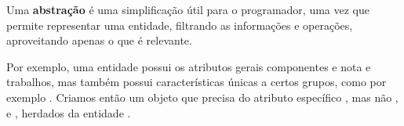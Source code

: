 Uma \textbf{abstração} é uma simplificação útil para o programador, uma vez que
permite representar uma entidade, filtrando as informações e operações,
aproveitando apenas o que é relevante.

Por exemplo, uma entidade  possui os atributos gerais
componentes e nota e trabalhos, mas também possui características únicas a
certos grupos, como por exemplo . Criamos então um objeto
 que precisa do atributo específico , mas não
,  e , herdados da entidade
.
